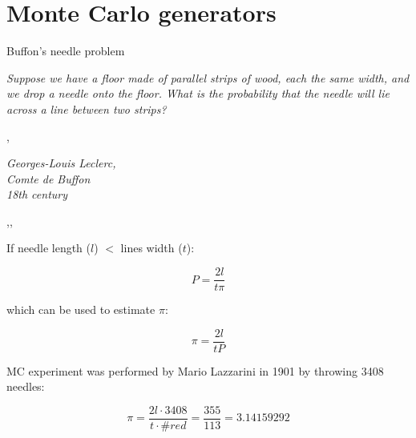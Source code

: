\section[toc=MC generators]{Monte Carlo generators}


\begin{wideslide}{Buffon's needle problem}
\null\vfill

  \twocolumn
  {
    {\it Suppose we have a floor made of parallel strips of wood, each the same width, and we drop a needle onto the floor. What is the probability that the needle will lie across a line between two strips?}
    
    \sep
    
    {\it\hfill Georges-Louis Leclerc,\\\hfill Comte de Buffon\\\hfill 18th century}
  }
  {
    \sep\sep
    \centering
  }
  
  \vspace{-10pt}
  
  \twocolumn
  {
    If needle length ($l$) $<$ lines width ($t$):
    
    $$P = \frac{2l}{t\pi}$$
    
    which can be used to estimate $\pi$:
    
    $$\pi = \frac{2l}{tP}$$
  }
  {
    MC experiment was performed by Mario Lazzarini in 1901 by throwing 3408 needles:
    
    $$\pi = \frac{2l \cdot 3408}{t \cdot \#red} = \frac{355}{113} = 3.14159292$$
  }
  
\vfill\null
\end{wideslide}


